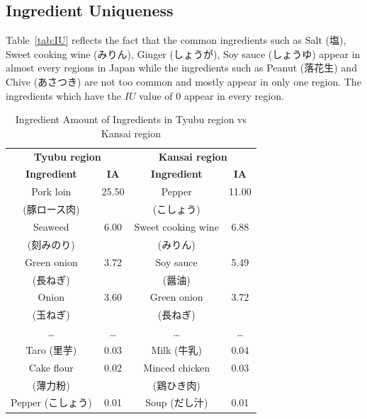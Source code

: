 \documentclass{sig-alternate}
\begin{document}
\begin{CJK}{UTF8}{min}
\subsection{Ingredient Uniqueness}
\begin{CJK}{UTF8}{min}

Table~\ref{tab:IU} reflects the fact that the common ingredients such as Salt (塩), Sweet cooking wine (みりん), Ginger (しょうが), Soy sauce (しょうゆ) appear in almost every regions in Japan while the ingredients such as Peanut (落花生) and Chive (あさつき) are not too common and mostly appear in only one region. The ingredients which have the $IU$ value of 0 appear in every region.


\begin{table}
\centering
\caption{Ingredient Amount of Ingredients in Tyubu region vs Kansai region}
\begin{tabular}{|c|c|c|c|}
\hline
\multicolumn{2}{|c|}{\textbf{\large Tyubu region}} & \multicolumn{2}{|c|}{\textbf{\large Kansai region}} \\
\cline{1-4}

\textbf{Ingredient} &\textbf{ IA} & \textbf{Ingredient} & \textbf{IA}\\ \hline
Pork loin 	&	25.50 	& Pepper 	&11.00\\ 
 (豚ロース肉) & & (こしょう) & \\ \hline
Seaweed 		&	6.00		& Sweet cooking wine 		&6.88\\ 
(刻みのり) & & (みりん) & \\ \hline
Green onion 	&	3.72		& Soy sauce 	& 5.49\\ 
 (長ねぎ)	 & & (醤油)	 & \\ \hline
Onion		&	3.60		& Green onion 		&3.72\\ 
 (玉ねぎ) & & (長ねぎ) & \\ \hline
\ldots &\ldots & \ldots & \ldots \\ \hline
Taro (里芋)			&	0.03		& Milk (牛乳)		&0.04\\ \hline
Cake flour	&	0.02		& Minced chicken		&0.03\\ 
 (薄力粉)	 & &  (鶏ひき肉) & \\ \hline
Pepper (こしょう)		&	0.01		& Soup (だし汁)		&0.01\\ \hline

\end{tabular}

\label{tab:IAoutlier}
\end{table} 
\end{CJK}



\end{CJK}
\end{document}
